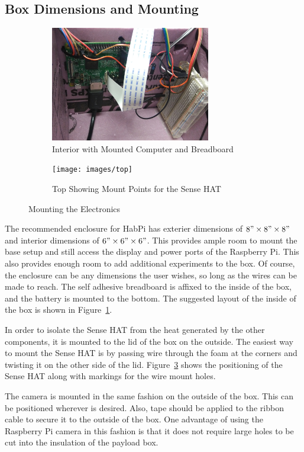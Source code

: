 \documentclass[journal]{new-aiaa}
\begin{document}
\subsection{Box Dimensions and Mounting}
\begin{figure}
    \centering
    \begin{subfigure}{0.45\textwidth}
        \includegraphics[width=2.75in]{images/interior}
        \caption{Interior with Mounted Computer and Breadboard}
        \label{fig:interior}
    \end{subfigure}
    \begin{subfigure}{0.45\textwidth}
        \texttt{[image: images/top]}
        \caption{Top Showing Mount Points for the Sense HAT}
        \label{fig:top}
    \end{subfigure}
    \caption{Mounting the Electronics}
\end{figure}
The recommended enclosure for HabPi has exterier dimensions of
$8"\times8"\times8"$ and interior dimensions of $6"\times6"\times6"$.
This provides ample room to mount the base setup and still access the
display and power ports of the Raspberry Pi.  This also provides
enough room to add additional experiments to the box.  Of course, the
enclosure can be any dimensions the user wishes, so long as the wires
can be made to reach.  The self adhesive breadboard is affixed to the
inside of the box, and the battery is mounted to the bottom.  The
suggested layout of the inside of the box is shown in
Figure~\ref{fig:interior}.

In order to isolate the Sense HAT from the heat generated by the other
components, it is mounted to the lid of the box on the outside.  The
easiest way to mount the Sense HAT is by passing wire through the foam
at the corners and twisting it on the other side of the lid.
Figure~\ref{fig:top} shows the positioning of the Sense HAT along with
markings for the wire mount holes.

The camera is mounted in the same fashion on the outside of the box.
This can be positioned wherever is desired.  Also, tape should be
applied to the ribbon cable to secure it to the outside of the box.
One advantage of using the Raspberry Pi camera in this fashion is that
it does not require large holes to be cut into the insulation of the
payload box.
\end{document}
